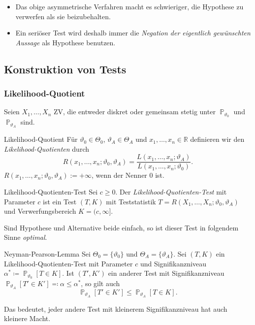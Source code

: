 \documentclass[a4paper,10pt]{article}
\def\R{\mathbb{R}}
\renewcommand{\P}{\operatorname{\mathbb{P}}}
\numberwithin{equation}{section}
\begin{document}
\begin{itemize}
    \item Das obige asymmetrische Verfahren macht es schwieriger, die Hypothese zu verwerfen als sie beizubehalten.
    \item Ein seriöser Test wird deshalb immer die \emph{Negation der eigentlich gewünschten Aussage} als Hypothese benutzen.
\end{itemize}


\subsection{Konstruktion von Tests}

\subsubsection{Likelihood-Quotient}

Seien \( X_1, \dots, X_n \) ZV, die entweder diskret oder gemeinsam stetig unter \( \P_{\vartheta_0} \) und \( \P_{\vartheta_A} \) sind.

\begin{mainbox}{Likelihood-Quotient}
    Für \( \vartheta_0 \in \Theta_0 \), \( \vartheta_A \in \Theta_A \) und \( x_1, \dots, x_n \in \R \) definieren wir den \emph{Likelihood-Quotienten} durch
    \[
        R(x_1, \dots, x_n; \vartheta_0, \vartheta_A) = \frac{L(x_1, \dots, x_n; \vartheta_A)}{L(x_1, \dots, x_n; \vartheta_0)} \text{.}
    \]
    \( R(x_1, \dots, x_n; \vartheta_0, \vartheta_A) := +\infty \), wenn der Nenner 0 ist.
\end{mainbox}

\begin{mainbox}{Likelihood-Quotienten-Test}
    Sei \( c \geq 0 \). Der \emph{Likelihood-Quotienten-Test} mit Parameter \( c \) ist ein Test \( (T, K) \) mit Teststatistik \( T = R(X_1, \dots, X_n; \vartheta_0, \vartheta_A) \) und Verwerfungsbereich \( K = (c, \infty] \).
\end{mainbox}

Sind Hypothese und Alternative beide einfach, so ist dieser Test in folgendem Sinne \emph{optimal}.

\begin{mainbox}{Neyman-Pearson-Lemma}
    Sei \( \Theta_0 = \{\vartheta_0\} \) und \( \Theta_A = \{\vartheta_A\} \). Sei \( (T, K) \) ein Likelihood-Quotienten-Test mit Parameter \( c \) und Signifikanzniveau \( \alpha^* \coloneqq \P_{\vartheta_0}[T \in K] \). Ist \( (T', K') \) ein anderer Test mit Signifikanzniveau \( \P_{\vartheta_A}[T' \in K'] \eqqcolon \alpha \leq \alpha^* \), so gilt auch
    \[
        \P_{\vartheta_A}[T' \in K'] \leq \P_{\vartheta_A}[T \in K] \text{.}
    \]
\end{mainbox}
Das bedeutet, jeder andere Test mit kleinerem Signifikanzniveau hat auch kleinere Macht.
\end{document}
